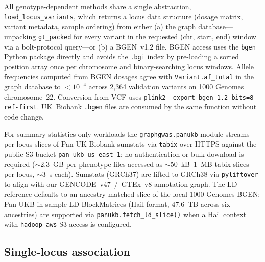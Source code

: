 All genotype-dependent methods share a single abstraction,
\texttt{load\_locus\_variants}, which returns a locus data structure
(dosage matrix, variant metadata, sample ordering) from either
(a) the graph database---unpacking \texttt{gt\_packed} for every
variant in the requested (chr, start, end) window via a
bolt-protocol query---or (b) a BGEN~v1.2 file. BGEN access uses
the \texttt{bgen} Python package directly and avoids the \texttt{.bgi}
index by pre-loading a sorted position array once per chromosome
and binary-searching locus windows. Allele frequencies computed
from BGEN dosages agree with \texttt{Variant.af\_total} in the graph
database to
$<10^{-4}$ across 2{,}364 validation variants on 1000 Genomes
chromosome~22. Conversion from VCF uses
\texttt{plink2 --export bgen-1.2 bits=8 --ref-first}. UK~Biobank
\texttt{.bgen} files are consumed by the same function without code
change.

For summary-statistics-only workloads the \texttt{graphgwas.panukb}
module streams per-locus slices of Pan-UK Biobank sumstats via
\texttt{tabix} over HTTPS against the public S3 bucket
\texttt{pan-ukb-us-east-1}; no authentication or bulk download is
required ($\sim$2.3~GB per-phenotype files accessed as
$\sim$50~kB--1~MB tabix slices per locus, $\sim$3~s each). Sumstats
(GRCh37) are lifted to GRCh38 via \texttt{pyliftover} to align with
our GENCODE~v47~/~GTEx~v8 annotation graph. The LD reference
defaults to an ancestry-matched slice of the local 1000 Genomes
BGEN; Pan-UKB in-sample LD BlockMatrices (Hail format, 47.6~TB
across six ancestries) are supported via
\texttt{panukb.fetch\_ld\_slice()} when a Hail context with
\texttt{hadoop-aws} S3 access is configured.

\subsection*{Single-locus association}

